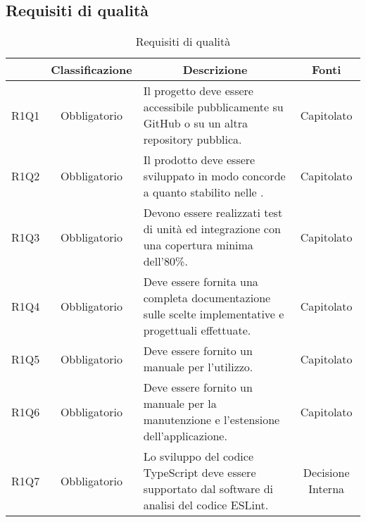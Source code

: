 \subsection{Requisiti di qualità} \label{subsection:requisiti_qualita}
\begin{table}[H]
    \centering
    \renewcommand{\arraystretch}{1.8}
    \begin{tabular}{c | c | p{6cm} | c}
        \rowcolor[HTML]{125E28}
        \multicolumn{1}{c}{\color[HTML]{FFFFFF} \textbf{Codice}}          &
        \multicolumn{1}{c}{\color[HTML]{FFFFFF} \textbf{Classificazione}} &
        \multicolumn{1}{c}{\color[HTML]{FFFFFF} \textbf{Descrizione}}     &
        \multicolumn{1}{c}{\color[HTML]{FFFFFF} \textbf{Fonti}}                                                                                                                                                                \\
        \hline
        R1Q1                                                              & Obbligatorio & Il progetto deve essere accessibile pubblicamente su GitHub\glo{} o su un altra repository\glo{} pubblica.      & Capitolato        \\
        R1Q2                                                              & Obbligatorio & Il prodotto deve essere sviluppato in modo concorde a quanto stabilito nelle \docNameVersionNdP{}.              & Capitolato        \\
        R1Q3                                                              & Obbligatorio & Devono essere realizzati test di unità ed integrazione con una copertura minima dell'80\%.                      & Capitolato        \\
        R1Q4                                                              & Obbligatorio & Deve essere fornita una completa documentazione sulle scelte implementative e progettuali effettuate.           & Capitolato        \\
        R1Q5                                                              & Obbligatorio & Deve essere fornito un manuale per l'utilizzo.                                                                  & Capitolato        \\
        R1Q6                                                              & Obbligatorio & Deve essere fornito un manuale per la manutenzione e l'estensione dell'applicazione.                            & Capitolato        \\
        R1Q7                                                              & Obbligatorio & Lo sviluppo del codice TypeScript\glo{} deve essere supportato dal software di analisi del codice ESLint\glo{}. & Decisione Interna \\
    \end{tabular}
    \caption{Requisiti di qualità}
\end{table}

